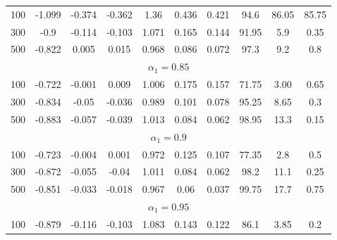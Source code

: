 \begin{table}[]
\begin{tabular}{lccccccccc}
\multicolumn{1}{l|}{100} & -1.099 & -0.374 & \multicolumn{1}{c|}{-0.362} & 1.36  & 0.436 & \multicolumn{1}{c|}{0.421} & 94.6        & 86.05      & 85.75      \\
\multicolumn{1}{l|}{300} & -0.9   & -0.114 & \multicolumn{1}{c|}{-0.103} & 1.071 & 0.165 & \multicolumn{1}{c|}{0.144} & 91.95       & 5.9        & 0.35       \\
\multicolumn{1}{l|}{500} & -0.822 & 0.005  & \multicolumn{1}{c|}{0.015}  & 0.968 & 0.086 & \multicolumn{1}{c|}{0.072} & 97.3        & 9.2        & 0.8        \\ \hline
\multicolumn{10}{c}{$\alpha_1 = 0.85$}                                                                                                                        \\ \hline
\multicolumn{1}{l|}{100} & -0.722 & -0.001 & \multicolumn{1}{c|}{0.009}  & 1.006 & 0.175 & \multicolumn{1}{c|}{0.157} & 71.75       & 3.00       & 0.65       \\
\multicolumn{1}{l|}{300} & -0.834 & -0.05  & \multicolumn{1}{c|}{-0.036} & 0.989 & 0.101 & \multicolumn{1}{c|}{0.078} & 95.25       & 8.65       & 0.3        \\
\multicolumn{1}{l|}{500} & -0.883 & -0.057 & \multicolumn{1}{c|}{-0.039} & 1.013 & 0.084 & \multicolumn{1}{c|}{0.062} & 98.95       & 13.3       & 0.15       \\ \hline
\multicolumn{10}{c}{$\alpha_1 = 0.9$}                                                                                                                         \\ \hline
\multicolumn{1}{l|}{100} & -0.723 & -0.004 & \multicolumn{1}{c|}{0.001}  & 0.972 & 0.125 & \multicolumn{1}{c|}{0.107} & 77.35       & 2.8        & 0.5        \\
\multicolumn{1}{l|}{300} & -0.872 & -0.055 & \multicolumn{1}{c|}{-0.04}  & 1.011 & 0.084 & \multicolumn{1}{c|}{0.062} & 98.2        & 11.1       & 0.25       \\
\multicolumn{1}{l|}{500} & -0.851 & -0.033 & \multicolumn{1}{c|}{-0.018} & 0.967 & 0.06  & \multicolumn{1}{c|}{0.037} & 99.75       & 17.7       & 0.75       \\ \hline
\multicolumn{10}{c}{$\alpha_1 = 0.95$}                                                                                                                        \\ \hline
\multicolumn{1}{l|}{100} & -0.879 & -0.116 & \multicolumn{1}{c|}{-0.103} & 1.083 & 0.143 & \multicolumn{1}{c|}{0.122} & 86.1        & 3.85       & 0.2        \\

\end{tabular}
\end{table}

